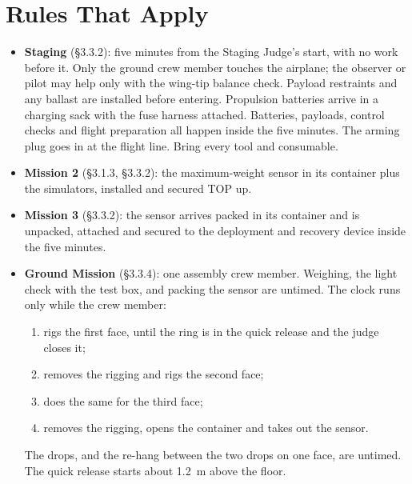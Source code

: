 \documentclass[final]{dbfdoc}
\begin{document}
\section{Rules That Apply}
\begin{itemize}
\item \textbf{Staging} (§3.3.2): five minutes from the Staging Judge's start, with no work before it. Only the ground crew member touches the airplane; the observer or pilot may help only with the wing-tip balance check. Payload restraints and any ballast are installed before entering. Propulsion batteries arrive in a charging sack with the fuse harness attached. Batteries, payloads, control checks and flight preparation all happen inside the five minutes. The arming plug goes in at the flight line. Bring every tool and consumable.
\item \textbf{Mission 2} (§3.1.3, §3.3.2): the maximum-weight sensor in its container plus the simulators, installed and secured TOP up.
\item \textbf{Mission 3} (§3.3.2): the sensor arrives packed in its container and is unpacked, attached and secured to the deployment and recovery device inside the five minutes.
\item \textbf{Ground Mission} (§3.3.4): one assembly crew member. Weighing, the light check with the test box, and packing the sensor are untimed. The clock runs only while the crew member:
\begin{enumerate}
\item rigs the first face, until the ring is in the quick release and the judge closes it;
\item removes the rigging and rigs the second face;
\item does the same for the third face;
\item removes the rigging, opens the container and takes out the sensor.
\end{enumerate}
The drops, and the re-hang between the two drops on one face, are untimed. The quick release starts about 1.2~m above the floor.
\end{itemize}
\end{document}
